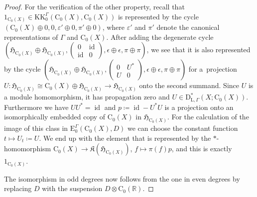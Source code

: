 \documentclass[11pt]{article}
\numberwithin{equation}{section}
\numberwithin{equation}{section}
\theoremstyle{definition}
\newcommand{\R}{\mathbb{R}}
\newcommand{\Ct}{\mathrm{C}}
\newcommand{\Cz}{\Ct_0}
\newcommand{\HilbertMod}{\mathfrak{H}}
\DeclareMathOperator{\id}{id}
\newcommand{\KK}{\mathrm{KK}}
\newcommand{\EE}{\mathrm{E}}
\newcommand{\PseudoLocLoc}{\mathrm{D}^*_{\mathrm{L},\Gamma}}
\newcommand{\Kom}{{\mathfrak{K}}}
\begin{document}
\begin{proof}
For the verification of the other property, recall that $1_{\Cz(X)}\in\KK_0^\Gamma(\Cz(X),\Cz(X))$ is represented by the cycle $(\Cz(X)\oplus 0,0,\varepsilon'\oplus 0,\pi'\oplus 0)$, where $\varepsilon'$ and $\pi'$ denote the canonical representations of $\Gamma$ and $\Cz(X)$. After adding the degenerate cycle $\left(\HilbertMod_{\Cz(X)}\oplus\HilbertMod_{\Cz(X)}, \left(\begin{smallmatrix}0&\id\\\id&0\end{smallmatrix}\right)\!,\epsilon\oplus\epsilon,\pi\oplus\pi\right)$, we see that it is also represented by the cycle $\left(\HilbertMod_{\Cz(X)}\oplus\HilbertMod_{\Cz(X)}, \left(\begin{smallmatrix}0&U^*\\U&0\end{smallmatrix}\right)\!,\epsilon\oplus\epsilon,\pi\oplus\pi\right)$ for a~projection $U\colon \HilbertMod_{\Cz(X)}\cong\Cz(X)\oplus\HilbertMod_{\Cz(X)}\to\HilbertMod_{\Cz(X)}$ onto the second summand. Since $U$ is a module homomorphism, it has propagation zero and $U\in \PseudoLocLoc(X;\Cz(X))$. Furthermore we have $UU^*=\id$ and $p\coloneqq \id-U^*U$ is a projection onto an isomorphically embedded copy of $\Cz(X)$ in $\HilbertMod_{\Cz(X)}$.
For the calculation of the image of this class in $\EE_0^\Gamma(\Cz(X),D)$ we can choose the constant function $t\mapsto U_t\coloneqq U$. We end up with the element that is represented by the $*$-homomorphism $\Cz(X)\to \Kom(\HilbertMod_{\Cz(X)})$, $f\mapsto \pi(f)p$, and this is exactly $1_{\Cz(X)}$.

The isomorphism in odd degrees now follows from the one in even degrees by replacing $D$ with the suspension $D\otimes \Cz(\R)$.
\end{proof}
\end{document}
